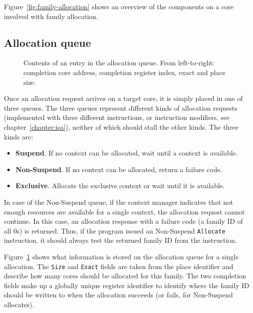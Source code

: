 Figure~\ref{fig:family-allocation} shows an overview of the components on a core involved with family allocation.

\subsection{Allocation queue}
\begin{figure}
 \begin{center}
  
  \caption{Contents of an entry in the allocation queue. From left-to-right: completion core address, completion register index, exact and place size.}
  \label{fig:alloc-queue-contents}
 \end{center}
\end{figure}

Once an allocation request arrives on a target core, it is simply placed in one of three queues. The three queues represent different kinds of allocation requests (implemented with three different instructions, or instruction modifiers, see chapter~\ref{chapter:isa}), neither of which should stall the other kinds. The three kinds are:
\begin{itemize}
\item {\bf Suspend}. If no context can be allocated, wait until a context is available.
\item {\bf Non-Suspend}. If no context can be allocated, return a failure code.
\item {\bf Exclusive}. Allocate the exclusive context or wait until it is available.
\end{itemize}

In case of the Non-Suspend queue, if the context manager indicates that not enough resources are available for a single context, the allocation request cannot continue. In this case, an allocation response with a failure code (a family ID of all 0s) is returned. Thus, if the program issued an Non-Suspend {\tt Allocate} instruction, it should always test the returned family ID from the instruction. 

Figure~\ref{fig:alloc-queue-contents} shows what information is stored on the allocation queue for a single allocation. The {\tt Size} and {\tt Exact} fields are taken from the place identifier and describe how many cores should be allocated for this family. The two completion fields make up a globally unique register identifier to identify where the family ID should be written to when the allocation succeeds (or fails, for Non-Suspend allocates).

